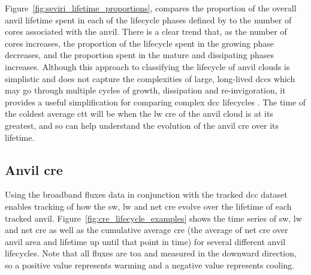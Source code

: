 Figure~\ref{fig:seviri_lifetime_proportions}, compares the proportion of the overall anvil lifetime spent in each of the lifecycle phases defined by \citet{futyan_deep_2007} to the number of cores associated with the anvil. 
There is a clear trend that, as the number of cores increases, the proportion of the lifecycle spent in the growing phase decreases, and the proportion spent in the mature and dissipating phases increases.
Although this approach to classifying the lifecycle of anvil clouds is simplistic and does not capture the complexities of large, long-lived \acrshort{dcc}s which may go through multiple cycles of growth, dissipation and re-invigoration, it provides a useful simplification for comparing complex \acrshort{dcc} lifecycles \citep{roca_simple_2017}. 
The time of the coldest average \acrshort{ctt} will be when the \acrshort{lw} \acrshort{cre} of the anvil cloud is at its greatest, and so can help understand the evolution of the anvil \acrshort{cre} over its lifetime.


\subsection{Anvil \acrshort{cre}}

Using the broadband fluxes data in conjunction with the tracked \acrshort{dcc} dataset enables tracking of how the \acrshort{sw}, \acrshort{lw} and net \acrshort{cre} evolve over the lifetime of each tracked anvil.
Figure~\ref{fig:cre_lifecycle_examples} shows the time series of \acrshort{sw}, \acrshort{lw} and net \acrshort{cre} as well as the cumulative average \acrshort{cre} (the average of net \acrshort{cre} over anvil area and lifetime up until that point in time) for several different anvil lifecycles.
Note that all fluxes are \acrshort{toa} and measured in the downward direction, so a positive value represents warming and a negative value represents cooling.


